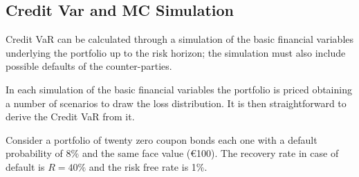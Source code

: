 \subsection{Credit Var and MC Simulation}

Credit VaR can be calculated through a simulation of the basic financial
variables underlying the portfolio up to the risk horizon; the simulation must also include possible defaults of the counter-parties. 

In each simulation of the basic financial variables the portfolio is priced obtaining a number of scenarios to draw the loss distribution. It is then straightforward to derive the Credit VaR from it.

Consider a portfolio of twenty zero coupon bonds each one with a default probability of 8\% and the same face value (\euro{100}). The recovery rate in case of default is $R=40\%$ and the risk free rate is 1\%.

